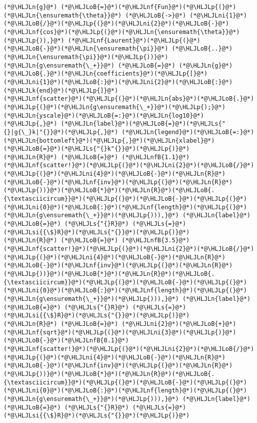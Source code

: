 \documentclass[12pt,a4paper]{article}
\newcommand{\HLJLk}[1]{\textcolor[RGB]{148,91,176}{\textbf{#1}}}
\newcommand{\HLJLn}[1]{#1}
\newcommand{\HLJLnf}[1]{\textcolor[RGB]{66,102,213}{#1}}
\newcommand{\HLJLs}[1]{\textcolor[RGB]{201,61,57}{#1}}
\newcommand{\HLJLsi}[1]{#1}
\newcommand{\HLJLnfB}[1]{\textcolor[RGB]{59,151,46}{#1}}
\newcommand{\HLJLni}[1]{\textcolor[RGB]{59,151,46}{#1}}
\newcommand{\HLJLoB}[1]{\textcolor[RGB]{102,102,102}{\textbf{#1}}}
\newcommand{\HLJLp}[1]{#1}
\begin{document}
\begin{lstlisting}
(*@\HLJLn{g}@*) (*@\HLJLoB{=}@*)(*@\HLJLnf{Fun}@*)(*@\HLJLp{(}@*)(*@\HLJLn{\ensuremath{\theta}}@*) (*@\HLJLoB{->}@*) (*@\HLJLni{1}@*)(*@\HLJLoB{/}@*)(*@\HLJLp{(}@*)(*@\HLJLni{2}@*)(*@\HLJLoB{-}@*)(*@\HLJLnf{cos}@*)(*@\HLJLp{(}@*)(*@\HLJLn{\ensuremath{\theta}}@*)(*@\HLJLp{)),}@*) (*@\HLJLnf{Laurent}@*)(*@\HLJLp{(}@*)(*@\HLJLoB{-}@*)(*@\HLJLn{\ensuremath{\pi}}@*) (*@\HLJLoB{..}@*) (*@\HLJLn{\ensuremath{\pi}}@*)(*@\HLJLp{))}@*)
(*@\HLJLn{g\ensuremath{\_+}}@*) (*@\HLJLoB{=}@*) (*@\HLJLn{g}@*)(*@\HLJLoB{.}@*)(*@\HLJLn{coefficients}@*)(*@\HLJLp{[}@*)(*@\HLJLni{1}@*)(*@\HLJLoB{:}@*)(*@\HLJLni{2}@*)(*@\HLJLoB{:}@*)(*@\HLJLk{end}@*)(*@\HLJLp{]}@*)
(*@\HLJLnf{scatter}@*)(*@\HLJLp{(}@*)(*@\HLJLn{abs}@*)(*@\HLJLoB{.}@*)(*@\HLJLp{(}@*)(*@\HLJLn{g\ensuremath{\_+}}@*)(*@\HLJLp{);}@*) (*@\HLJLn{yscale}@*)(*@\HLJLoB{=:}@*)(*@\HLJLn{log10}@*)(*@\HLJLp{,}@*) (*@\HLJLn{label}@*)(*@\HLJLoB{=}@*)(*@\HLJLs{"{}|g{\_}k|"{}}@*)(*@\HLJLp{,}@*) (*@\HLJLn{legend}@*)(*@\HLJLoB{=:}@*)(*@\HLJLn{bottomleft}@*)(*@\HLJLp{,}@*)(*@\HLJLn{xlabel}@*)(*@\HLJLoB{=}@*)(*@\HLJLs{"{}k"{}}@*)(*@\HLJLp{)}@*)
(*@\HLJLn{R}@*) (*@\HLJLoB{=}@*) (*@\HLJLnfB{1.1}@*)
(*@\HLJLnf{scatter!}@*)(*@\HLJLp{(}@*)(*@\HLJLni{2}@*)(*@\HLJLoB{/}@*)(*@\HLJLp{(}@*)(*@\HLJLni{4}@*)(*@\HLJLoB{-}@*)(*@\HLJLn{R}@*)(*@\HLJLoB{-}@*)(*@\HLJLnf{inv}@*)(*@\HLJLp{(}@*)(*@\HLJLn{R}@*)(*@\HLJLp{))}@*)(*@\HLJLoB{*}@*)(*@\HLJLn{R}@*)(*@\HLJLoB{.{\textasciicircum}}@*)(*@\HLJLp{(}@*)(*@\HLJLoB{-}@*)(*@\HLJLp{(}@*)(*@\HLJLni{0}@*)(*@\HLJLoB{:}@*)(*@\HLJLnf{length}@*)(*@\HLJLp{(}@*)(*@\HLJLn{g\ensuremath{\_+}}@*)(*@\HLJLp{))),}@*) (*@\HLJLn{label}@*) (*@\HLJLoB{=}@*) (*@\HLJLs{"{}R}@*) (*@\HLJLs{=}@*) (*@\HLJLsi{{\$}R}@*)(*@\HLJLs{"{}}@*)(*@\HLJLp{)}@*)
(*@\HLJLn{R}@*) (*@\HLJLoB{=}@*) (*@\HLJLnfB{3.5}@*)
(*@\HLJLnf{scatter!}@*)(*@\HLJLp{(}@*)(*@\HLJLni{2}@*)(*@\HLJLoB{/}@*)(*@\HLJLp{(}@*)(*@\HLJLni{4}@*)(*@\HLJLoB{-}@*)(*@\HLJLn{R}@*)(*@\HLJLoB{-}@*)(*@\HLJLnf{inv}@*)(*@\HLJLp{(}@*)(*@\HLJLn{R}@*)(*@\HLJLp{))}@*)(*@\HLJLoB{*}@*)(*@\HLJLn{R}@*)(*@\HLJLoB{.{\textasciicircum}}@*)(*@\HLJLp{(}@*)(*@\HLJLoB{-}@*)(*@\HLJLp{(}@*)(*@\HLJLni{0}@*)(*@\HLJLoB{:}@*)(*@\HLJLnf{length}@*)(*@\HLJLp{(}@*)(*@\HLJLn{g\ensuremath{\_+}}@*)(*@\HLJLp{))),}@*) (*@\HLJLn{label}@*) (*@\HLJLoB{=}@*) (*@\HLJLs{"{}R}@*) (*@\HLJLs{=}@*) (*@\HLJLsi{{\$}R}@*)(*@\HLJLs{"{}}@*)(*@\HLJLp{)}@*)
(*@\HLJLn{R}@*) (*@\HLJLoB{=}@*) (*@\HLJLni{2}@*)(*@\HLJLoB{+}@*)(*@\HLJLnf{sqrt}@*)(*@\HLJLp{(}@*)(*@\HLJLni{3}@*)(*@\HLJLp{)}@*)(*@\HLJLoB{-}@*)(*@\HLJLnfB{0.1}@*)
(*@\HLJLnf{scatter!}@*)(*@\HLJLp{(}@*)(*@\HLJLni{2}@*)(*@\HLJLoB{/}@*)(*@\HLJLp{(}@*)(*@\HLJLni{4}@*)(*@\HLJLoB{-}@*)(*@\HLJLn{R}@*)(*@\HLJLoB{-}@*)(*@\HLJLnf{inv}@*)(*@\HLJLp{(}@*)(*@\HLJLn{R}@*)(*@\HLJLp{))}@*)(*@\HLJLoB{*}@*)(*@\HLJLn{R}@*)(*@\HLJLoB{.{\textasciicircum}}@*)(*@\HLJLp{(}@*)(*@\HLJLoB{-}@*)(*@\HLJLp{(}@*)(*@\HLJLni{0}@*)(*@\HLJLoB{:}@*)(*@\HLJLnf{length}@*)(*@\HLJLp{(}@*)(*@\HLJLn{g\ensuremath{\_+}}@*)(*@\HLJLp{))),}@*) (*@\HLJLn{label}@*) (*@\HLJLoB{=}@*) (*@\HLJLs{"{}R}@*) (*@\HLJLs{=}@*) (*@\HLJLsi{{\$}R}@*)(*@\HLJLs{"{}}@*)(*@\HLJLp{)}@*)
\end{lstlisting}
\end{document}
